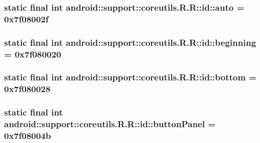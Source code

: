 \hypertarget{classandroid_1_1support_1_1coreutils_1_1_r_1_1id_98c960537c93ea22afc59c69d266a3cf}{
\subsubsection[{auto}]{\setlength{\rightskip}{0pt plus 5cm}static final int android::support::coreutils.R.R::id::auto = 0x7f08002f}}
\label{classandroid_1_1support_1_1coreutils_1_1_r_1_1id_98c960537c93ea22afc59c69d266a3cf}


\hypertarget{classandroid_1_1support_1_1coreutils_1_1_r_1_1id_3ed4fddd5244eea095e2adf771c4dcbd}{
\subsubsection[{beginning}]{\setlength{\rightskip}{0pt plus 5cm}static final int android::support::coreutils.R.R::id::beginning = 0x7f080020}}
\label{classandroid_1_1support_1_1coreutils_1_1_r_1_1id_3ed4fddd5244eea095e2adf771c4dcbd}


\hypertarget{classandroid_1_1support_1_1coreutils_1_1_r_1_1id_282579f08cdf94b3c3076a22ea8d2e1a}{
\subsubsection[{bottom}]{\setlength{\rightskip}{0pt plus 5cm}static final int android::support::coreutils.R.R::id::bottom = 0x7f080028}}
\label{classandroid_1_1support_1_1coreutils_1_1_r_1_1id_282579f08cdf94b3c3076a22ea8d2e1a}


\hypertarget{classandroid_1_1support_1_1coreutils_1_1_r_1_1id_4536edc92fe83dca95b66039f67ceca6}{
\subsubsection[{buttonPanel}]{\setlength{\rightskip}{0pt plus 5cm}static final int android::support::coreutils.R.R::id::buttonPanel = 0x7f08004b}}
\label{classandroid_1_1support_1_1coreutils_1_1_r_1_1id_4536edc92fe83dca95b66039f67ceca6}


